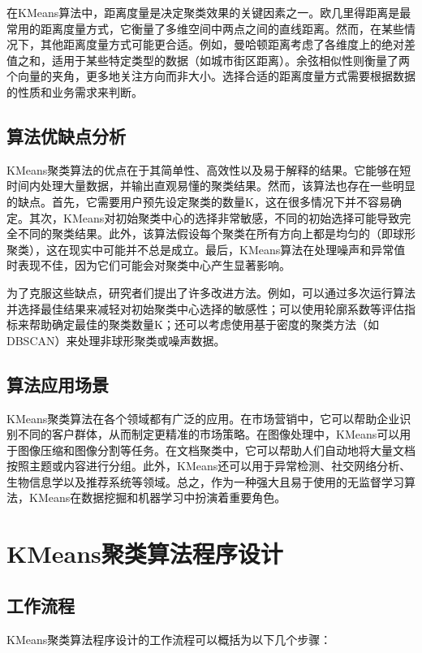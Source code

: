 在KMeans算法中，距离度量是决定聚类效果的关键因素之一。欧几里得距离是最常用的距离度量方式，它衡量了多维空间中两点之间的直线距离。然而，在某些情况下，其他距离度量方式可能更合适。例如，曼哈顿距离考虑了各维度上的绝对差值之和，适用于某些特定类型的数据（如城市街区距离）。余弦相似性则衡量了两个向量的夹角，更多地关注方向而非大小。选择合适的距离度量方式需要根据数据的性质和业务需求来判断。

\subsection{算法优缺点分析}

KMeans聚类算法的优点在于其简单性、高效性以及易于解释的结果。它能够在短时间内处理大量数据，并输出直观易懂的聚类结果。然而，该算法也存在一些明显的缺点。首先，它需要用户预先设定聚类的数量K，这在很多情况下并不容易确定。其次，KMeans对初始聚类中心的选择非常敏感，不同的初始选择可能导致完全不同的聚类结果。此外，该算法假设每个聚类在所有方向上都是均匀的（即球形聚类），这在现实中可能并不总是成立。最后，KMeans算法在处理噪声和异常值时表现不佳，因为它们可能会对聚类中心产生显著影响。

为了克服这些缺点，研究者们提出了许多改进方法。例如，可以通过多次运行算法并选择最佳结果来减轻对初始聚类中心选择的敏感性；可以使用轮廓系数等评估指标来帮助确定最佳的聚类数量K；还可以考虑使用基于密度的聚类方法（如DBSCAN）来处理非球形聚类或噪声数据。

\subsection{算法应用场景}

KMeans聚类算法在各个领域都有广泛的应用。在市场营销中，它可以帮助企业识别不同的客户群体，从而制定更精准的市场策略。在图像处理中，KMeans可以用于图像压缩和图像分割等任务。在文档聚类中，它可以帮助人们自动地将大量文档按照主题或内容进行分组。此外，KMeans还可以用于异常检测、社交网络分析、生物信息学以及推荐系统等领域。总之，作为一种强大且易于使用的无监督学习算法，KMeans在数据挖掘和机器学习中扮演着重要角色。

\section{KMeans聚类算法程序设计}

\subsection{工作流程}

KMeans聚类算法程序设计的工作流程可以概括为以下几个步骤：

